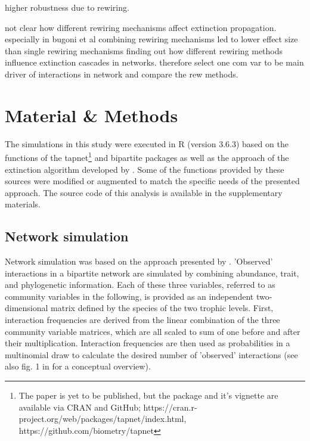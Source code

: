 \documentclass[12pt,a4paper]{article}
\begin{document}
\parencite{kaiser-bunbury2010, schleuning2016, timoteo2016, costa2018} higher robustness due to rewiring. %


	not clear how different rewiring mechanisms affect extinction propagation. especially in bugoni et al combining rewiring mechanisms led to lower effect size than single rewiring mechanisms
	finding out how different rewiring methods influence extinction cascades in networks. therefore select one com var to be main driver of interactions in network and compare the rew methods. 

\newpage
	\section{Material \& Methods}
	The simulations in this study were executed in R \parencite{rcore} (version 3.6.3) based on the functions of the tapnet\footnote{The paper is yet to be published, but the package and it's vignette are available via CRAN and GitHub; https://cran.r-project.org/web/packages/tapnet/index.html, https://github.com/biometry/tapnet} \parencite{benadi} and bipartite \parencite{dormann2008} packages as well as the approach of the extinction algorithm developed by \citeauthor{vizentin-bugoni2019}. Some of the functions provided by these sources were modified or augmented to match the specific needs of the presented approach. The source code of this analysis is available in the supplementary materials. \par



	\subsection{Network simulation} \label{sec:net_sim}
	Network simulation was based on the approach presented by \citeauthor{benadi}. 'Observed' interactions in a bipartite network are simulated by combining abundance, trait, and phylogenetic information. Each of these three variables, referred to as community variables in the following, is provided as an independent two-dimensional matrix defined by the species of the two trophic levels. First, interaction frequencies are derived from the linear combination of the three community variable matrices, which are all scaled to sum of one before and after their multiplication. Interaction frequencies are then used as probabilities in a multinomial draw to calculate the desired number of 'observed' interactions (see also fig. 1 in \cite{benadi} for a conceptual overview). \par
\end{document}
